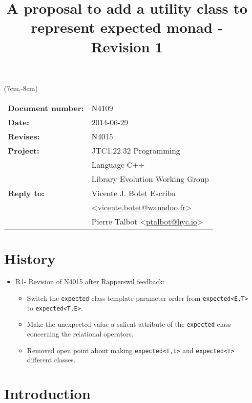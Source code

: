 \documentclass[a4paper,10pt]{article}
\title{A proposal to add a utility class to represent expected monad - Revision 1}
\author{}
\date{}
\newcommand{\cpp}[1]{\lstinline{#1}}
\begin{document}
\maketitle
\begin{textblock*}{9cm}(7cm,-8cm)
\begin{tabular}{l l}
\textbf{Document number:} & N4109 \\
\textbf{Date:}  & 2014-06-29 \\
\textbf{Revises:} & N4015 \\
\textbf{Project:} & JTC1.22.32 Programming \\
 & Language C++ \\
 & Library Evolution Working Group \\
\textbf{Reply to:} & Vicente J. Botet Escriba \\
 & <\href{mailto:vicente.botet@wanadoo.fr}{vicente.botet@wanadoo.fr}> \\
 & Pierre Talbot <\href{mailto:ptalbot@hyc.io}{ptalbot@hyc.io}>
\end{tabular}
\end{textblock*}

\vspace{-6em}
\setcounter{tocdepth}{1}
\tableofcontents

\section{History}
\label{history}

\begin{itemize}
\item R1- Revision of N4015 \cite{ExpectedR0} after Rapperswil feedback: 
\begin{itemize}
\item Switch the \cpp{expected} class template parameter order from \cpp{expected<E,T>} to \cpp{expected<T,E>}.
\item Make the unexpected value a salient attribute of the \cpp{expected} class concerning the relational operators.
\item Removed open point about making \cpp{expected<T,E>} and \cpp{expected<T>} different classes.
\end{itemize}
\end{itemize}

\section{Introduction}
\end{document}
